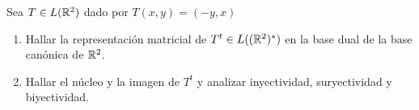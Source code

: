 \item Sea $T\in L(\mathbb{R}^2)$ dado por $T(x,y)=(-y,x)$
    \begin{enumerate}
        \item Hallar la representación matricial de $T^t\in L((\mathbb{R}^2)^*)$ en la base dual de la base canónica de $\mathbb{R}^2$.
            \begin{mdframed}[style=s]
                
            \end{mdframed}
        \item Hallar el núcleo y la imagen de $T^t$ y analizar inyectividad, suryectividad y biyectividad.
            \begin{mdframed}[style=s]
                
            \end{mdframed}
    \end{enumerate}
